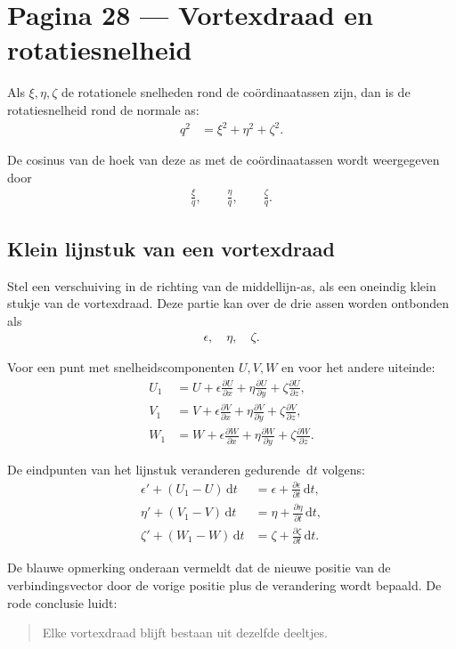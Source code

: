 \documentclass[11pt]{article}
\newcommand{\dd}{\,\mathrm{d}}
\newcommand{\pd}[2]{\frac{\partial #1}{\partial #2}}
\begin{document}
\section*{Pagina 28 --- Vortexdraad en rotatiesnelheid}

Als $\xi,\eta,\zeta$ de rotationele snelheden rond de coördinaatassen zijn, dan is de rotatiesnelheid rond de normale as:
\begin{align*}
q^2
  &=
  \xi^2+\eta^2+\zeta^2.
\end{align*}

De cosinus van de hoek van deze as met de coördinaatassen wordt weergegeven door
\begin{align*}
\frac{\xi}{q},\qquad
\frac{\eta}{q},\qquad
\frac{\zeta}{q}.
\end{align*}

\subsection*{Klein lijnstuk van een vortexdraad}

Stel een verschuiving in de richting van de middellijn-as, als een oneindig klein stukje van de vortexdraad. Deze partie kan over de drie assen worden ontbonden als
\begin{align*}
\epsilon,\quad \eta,\quad \zeta.
\end{align*}

Voor een punt met snelheidscomponenten $U,V,W$ en voor het andere uiteinde:
\begin{align*}
U_1
&=
U+\epsilon\pd{U}{x}
+\eta\pd{U}{y}
+\zeta\pd{U}{z},
\\
V_1
&=
V+\epsilon\pd{V}{x}
+\eta\pd{V}{y}
+\zeta\pd{V}{z},
\\
W_1
&=
W+\epsilon\pd{W}{x}
+\eta\pd{W}{y}
+\zeta\pd{W}{z}.
\end{align*}

De eindpunten van het lijnstuk veranderen gedurende $\dd t$ volgens:
\begin{align*}
\epsilon' + \left(U_1-U\right)\dd t
  &=
  \epsilon+\pd{\epsilon}{t}\dd t,
\\
\eta' + \left(V_1-V\right)\dd t
  &=
  \eta+\pd{\eta}{t}\dd t,
\\
\zeta' + \left(W_1-W\right)\dd t
  &=
  \zeta+\pd{\zeta}{t}\dd t.
\end{align*}

De blauwe opmerking onderaan vermeldt dat de nieuwe positie van de verbindingsvector door de vorige positie plus de verandering wordt bepaald. De rode conclusie luidt:
\begin{quote}
Elke vortexdraad blijft bestaan uit dezelfde deeltjes.
\end{quote}
\end{document}
